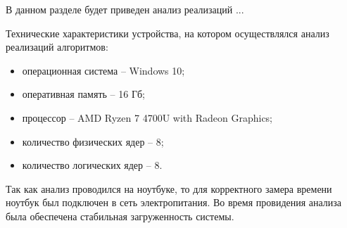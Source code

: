 \label{cha:research}
В данном разделе будет приведен анализ реализаций ...

Технические характеристики устройства, на котором осуществлялся анализ реализаций алгоритмов:
\begin{itemize}
	\item операционная система -- Windows 10;
	\item оперативная память -- 16 Гб;
	\item процессор -- AMD Ryzen 7 4700U with Radeon Graphics;
	\item количество физических ядер -- 8;
	\item количество логических ядер -- 8.
\end{itemize}

Так как анализ проводился на ноутбуке, то для корректного замера времени ноутбук был подключен в сеть электропитания. Во время провидения анализа была обеспечена стабильная загруженность системы.


